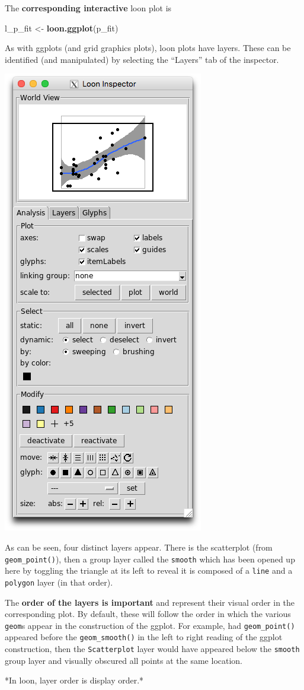 \documentclass[]{article}
\newenvironment{Shaded}{\begin{snugshade}}{\end{snugshade}}
\newcommand{\KeywordTok}[1]{\textcolor[rgb]{0.13,0.29,0.53}{\textbf{#1}}}
\newcommand{\StringTok}[1]{\textcolor[rgb]{0.31,0.60,0.02}{#1}}
\newcommand{\NormalTok}[1]{#1}
\begin{document}
The \textbf{corresponding interactive} loon plot is

\begin{Shaded}
\begin{Highlighting}[]
\NormalTok{l_p_fit <-}\StringTok{ }\KeywordTok{loon.ggplot}\NormalTok{(p_fit)}
\end{Highlighting}
\end{Shaded}

As with ggplots (and grid graphics plots), loon plots have layers. These
can be identified (and manipulated) by selecting the ``Layers'' tab of
the inspector.

\begin{center}\includegraphics[width=0.25\linewidth]{./img/ggplots2loon//inspector_l_p_fit} \end{center}

As can be seen, four distinct layers appear. There is the scatterplot
(from \texttt{geom\_point()}), then a group layer called the
\texttt{smooth} which has been opened up here by toggling the triangle
at its left to reveal it is composed of a \texttt{line} and a
\texttt{polygon} layer (in that order).

The \textbf{order of the layers is important} and represent their visual
order in the corresponding plot. By default, these will follow the order
in which the various \texttt{geom}s appear in the construction of the
ggplot. For example, had \texttt{geom\_point()} appeared before the
\texttt{geom\_smooth()} in the left to right reading of the ggplot
construction, then the \texttt{Scatterplot} layer would have appeared
below the \texttt{smooth} group layer and visually obscured all points
at the same location.

\begin{center}
*In loon, layer order is display order.*
\end{center}
\end{document}
